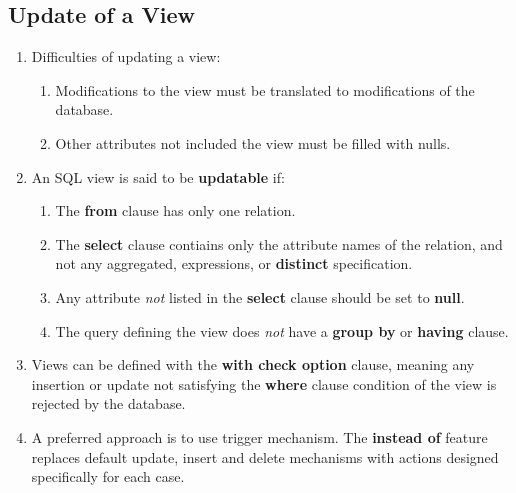 \documentclass[journal,12pt,twocolumn]{IEEEtran}
\begin{document}
\subsection{Update of a View}
\begin{enumerate}
    \item Difficulties of updating a view:
    \begin{enumerate}
        \item Modifications to the view must be translated to modifications of 
        the database.
        \item Other attributes not included the view must be filled with nulls.
    \end{enumerate}
    \item An SQL view is said to be \textbf{updatable} if:
    \begin{enumerate}
        \item The \textbf{from} clause has only one relation.
        \item The \textbf{select} clause contiains only the attribute names of 
        the relation, and not any aggregated, expressions, or \textbf{distinct}
        specification.
        \item Any attribute \textit{not} listed in the \textbf{select} clause 
        should be set to \textbf{null}.
        \item The query defining the view does \textit{not} have a 
        \textbf{group by} or \textbf{having} clause.
    \end{enumerate}
    \item Views can be defined with the \textbf{with check option} clause, 
    meaning any insertion or update not satisfying the \textbf{where} clause 
    condition of the view is rejected by the database.
    \item A preferred approach is to use trigger mechanism. The \textbf{instead 
    of} feature replaces default update, insert and delete mechanisms with 
    actions designed specifically for each case.
\end{enumerate}
\end{document}
